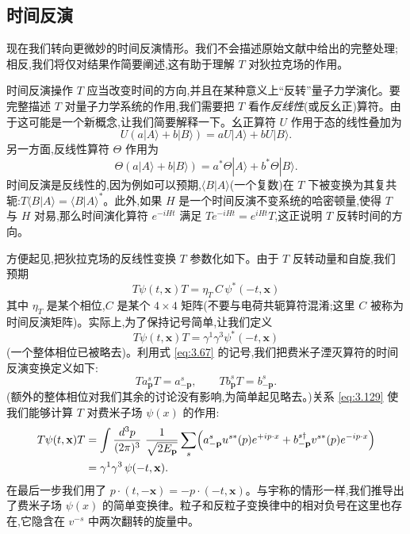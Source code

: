 \subsection{时间反演}

现在我们转向更微妙的时间反演情形。我们不会描述原始文献中给出的完整处理;相反,我们将仅对结果作简要阐述,这有助于理解 $T$ 对狄拉克场的作用。

时间反演操作 $T$ 应当改变时间的方向,并且在某种意义上``反转''量子力学演化。要完整描述 $T$ 对量子力学系统的作用,我们需要把 $T$ 看作\emph{反线性}(或反幺正)算符。由于这可能是一个新概念,让我们简要解释一下。幺正算符 $U$ 作用于态的线性叠加为
\begin{equation}
  U(a|A\rangle + b|B\rangle) = aU|A\rangle + bU|B\rangle .
\end{equation}
另一方面,反线性算符 $\Theta$ 作用为
\begin{equation}
  \Theta(a|A\rangle + b|B\rangle) = a^{*}\Theta|A\rangle + b^{*}\Theta|B\rangle .
\end{equation}
时间反演是反线性的,因为例如可以预期,$\langle B|A\rangle$(一个复数)在 $T$ 下被变换为其复共轭:$T\langle B|A\rangle = \langle B|A\rangle^{*}$。此外,如果 $H$ 是一个时间反演不变系统的哈密顿量,使得 $T$ 与 $H$ 对易,那么时间演化算符 $e^{-iHt}$ 满足 $Te^{-iHt} = e^{iHt}T$,这正说明 $T$ 反转时间的方向。

方便起见,把狄拉克场的反线性变换 $T$ 参数化如下。由于 $T$ 反转动量和自旋,我们预期
\begin{equation}
  T\psi(t,\mathbf{x})T = \eta_T\, C\,\psi^{*}(-t,\mathbf{x})
\end{equation}
其中 $\eta_T$ 是某个相位,$C$ 是某个 $4\times4$ 矩阵(不要与电荷共轭算符混淆;这里 $C$ 被称为时间反演矩阵)。实际上,为了保持记号简单,让我们定义
\begin{equation}
  T\psi(t,\mathbf{x})T = \gamma^1\gamma^3\psi^{*}(-t,\mathbf{x})
  \label{eq:3.128}
\end{equation}
(一个整体相位已被略去)。利用式 \eqref{eq:3.67} 的记号,我们把费米子湮灭算符的时间反演变换定义如下:
\begin{equation}
  T a_{\mathbf{p}}^s T = a_{-\mathbf{p}}^s,\qquad
  T b_{\mathbf{p}}^s T = b_{-\mathbf{p}}^s .
  \label{eq:3.129}
\end{equation}
(额外的整体相位对我们其余的讨论没有影响,为简单起见略去。)关系 \eqref{eq:3.129} 使我们能够计算 $T$ 对费米子场 $\psi(x)$ 的作用:
\begin{align}
  T\psi(t,\mathbf{x})T &= \int \frac{d^3p}{(2\pi)^3}\ \frac{1}{\sqrt{2E_{\mathbf{p}}}}
    \sum_s \Bigl( a_{-\mathbf{p}}^s u^{s*}(p)e^{+ip\cdot x}
      + b_{-\mathbf{p}}^{s\dagger} v^{s*}(p)e^{-ip\cdot x} \Bigr)\\
  &= \gamma^1\gamma^3\,\psi(-t,\mathbf{x}) .
  \label{eq:3.130}
\end{align}
在最后一步我们用了 $p\cdot(t,-\mathbf{x}) = -p\cdot(-t,\mathbf{x})$。与宇称的情形一样,我们推导出了费米子场 $\psi(x)$ 的简单变换律。粒子和反粒子变换律中的相对负号在这里也存在,它隐含在 $v^{-s}$ 中两次翻转的旋量中。

